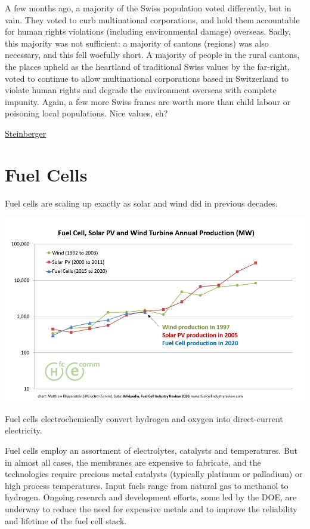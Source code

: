 \documentclass[
]{book}
\begin{document}
A few months ago, a majority of the Swiss population voted differently, but in vain. They voted to curb multinational corporations, and hold them accountable for human rights violations (including environmental damage) overseas. Sadly, this majority was not sufficient: a majority of cantons (regions) was also necessary, and this fell woefully short. A majority of people in the rural cantons, the places upheld as the heartland of traditional Swiss values by the far-right, voted to continue to allow multinational corporations based in Switzerland to violate human rights and degrade the environment overseas with complete impunity. Again, a few more Swiss francs are worth more than child labour or poisoning local populations. Nice values, eh?

\href{https://jksteinberger.medium.com/the-bear-the-tiger-and-the-trade-unionist-4b25df5fb3a9}{Steinberger}

\hypertarget{fuel-cells}{%
\chapter{Fuel Cells}\label{fuel-cells}}

Fuel cells are scaling up exactly as solar and wind did in previous decades.

\includegraphics{fig/fuel-cell_catch-up.png}

Fuel cells electrochemically convert hydrogen and oxygen into direct-current electricity.

Fuel cells employ an assortment of electrolytes, catalysts and temperatures. But in almost all cases, the membranes are expensive to fabricate, and the technologies require precious metal catalysts (typically platinum or palladium) or high process temperatures. Input fuels range from natural gas to methanol to hydrogen. Ongoing research and development efforts, some led by the DOE, are underway to reduce the need for expensive metals and to improve the reliability and lifetime of the fuel cell stack.
\end{document}
